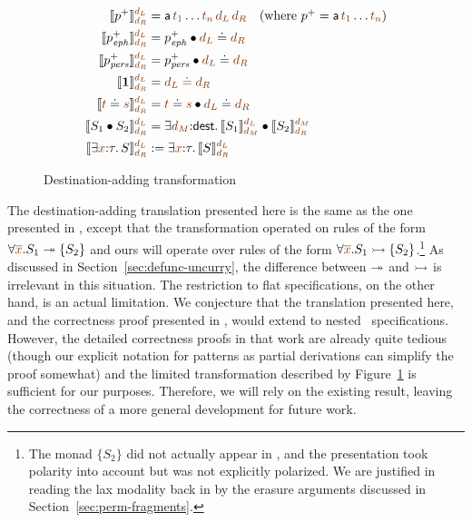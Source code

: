 \begin{figure}
\begin{align*}
\llbracket p^+ \rrbracket^{\lf{d_L}}_{\lf{d_R}} & = 
 {\sf a}\,\lf{t_1}\ldots \lf{t_n}\,\lf{d_L}\,\lf{d_R} ~~~ \mbox{(where $p^+ = {\sf a}\,\lf{t_1}\ldots \lf{t_n}$)}
\\
\llbracket p^+_\meph \rrbracket^{\lf{d_L}}_{\lf{d_R}} & = p^+_\meph \fuse \lf{d_L} \doteq \lf{d_R}
\\
\llbracket p^+_\mpers \rrbracket^{\lf{d_L}}_{\lf{d_R}} & = p^+_\mpers \fuse \lf{d_L} \doteq \lf{d_R}
\\
\llbracket \one \rrbracket^{\lf{d_L}}_{\lf{d_R}} & = \lf{d_L \doteq d_R}
\\
\llbracket \lf t \doteq \lf s \rrbracket^{\lf{d_L}}_{\lf{d_R}} & = \lf{t} \doteq \lf{s} \fuse \lf{d_L} \doteq \lf{d_R}
\\
\llbracket S_1 \fuse S_2 \rrbracket^{\lf{d_L}}_{\lf{d_R}} & = 
 \exists \lf{d_M}{:}{\sf dest}.\, 
   \llbracket S_1 \rrbracket^{\lf{d_L}}_{\lf{d_M}}
   \fuse
   \llbracket S_2 \rrbracket^{\lf{d_M}}_{\lf{d_R}}
\\
\llbracket \exists \lf{x}{:}\tau.\,S \rrbracket^{\lf{d_L}}_{\lf{d_R}} & := 
 \exists \lf{x}{:}\tau.\, \llbracket S \rrbracket^{\lf{d_L}}_{\lf{d_R}}
\end{align*}
\caption{Destination-adding transformation}
\label{fig:destadd-pos}
\end{figure}


The destination-adding translation presented here is the same as the
one presented in \cite{simmons11logical}, except that the
transformation operated on rules of the form $\forall
\lf{\overline{x}}. S_1 \righti \{ S_2 \}$ and ours will operate over rules
of the form $\forall \lf{\overline{x}}. S_1 \lefti \{ S_2 \}$.\footnote{The
  monad $\{ S_2 \}$ did not actually appear in
  \cite{simmons11logical}, and the presentation took polarity into
  account but was not explicitly polarized. We are justified in
  reading the lax modality back in by the erasure arguments discussed
  in Section~\ref{sec:perm-fragments}.} As discussed in
Section~\ref{sec:defunc-uncurry}, the difference between $\twoheadrightarrow$ and
$\rightarrowtail$ is irrelevant in this situation. The restriction to flat
specifications, on the other hand, is an actual limitation. We
conjecture that the translation presented here, and the correctness
proof presented in \cite{simmons11logical}, would extend to nested
\sls~specifications. However, the detailed correctness proofs in that work are
already quite tedious (though our explicit notation for patterns as
partial derivations can simplify the proof somewhat) and the
limited transformation described by Figure~\ref{fig:destadd-pos}
 is sufficient for our purposes. Therefore, we
will rely on the existing result, leaving the correctness of a more
general development for future work.

